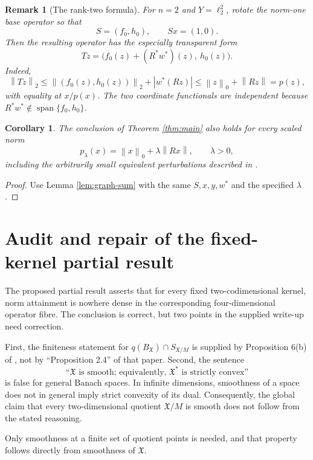 \documentclass[11pt]{article}
\newtheorem{corollary}[theorem]{Corollary}
\newtheorem{remark}[theorem]{Remark}
\theoremstyle{definition}
\newcommand{\X}{\mathfrak X}
\newcommand{\norm}[1]{\left\lVert #1\right\rVert}
\newcommand{\abs}[1]{\left\lvert #1\right\rvert}
\begin{document}
\begin{remark}[The rank-two formula]\label{rem:rank-two-formula}
For \(n=2\) and \(Y=\ell_2^2\), rotate the norm-one base operator so that
\[
                S=(f_0,h_0),\qquad Sx=(1,0).
\]
Then the resulting operator has the especially transparent form
\[
        Tz=\bigl(f_0(z)+(R^*w^*)(z),\ h_0(z)\bigr).
\]
Indeed,
\[
 \norm{Tz}_2
 \leq \norm{(f_0(z),h_0(z))}_2+\abs{w^*(Rz)}
 \leq \norm{z}_0+\norm{Rz}=p(z),
\]
with equality at \(x/p(x)\).  The two coordinate functionals are independent
because \(R^*w^*\notin\operatorname{span}\{f_0,h_0\}\).
\end{remark}

\begin{corollary}\label{cor:scaled}
The conclusion of Theorem \ref{thm:main} also holds for every scaled norm
\[
              p_\lambda(x)=\norm{x}_0+\lambda\norm{Rx},
              \qquad \lambda>0,
\]
including the arbitrarily small equivalent perturbations described in
\cite[Remark 2]{Martin2025}.
\end{corollary}

\begin{proof}
Use Lemma \ref{lem:graph-sum} with the same \(S,x,y,w^*\) and the specified
\(\lambda\).
\end{proof}

\section{Audit and repair of the fixed-kernel partial result}

The proposed partial result asserts that for every fixed two-codimensional
kernel, norm attainment is nowhere dense in the corresponding four-dimensional
operator fibre.  The conclusion is correct, but two points in the supplied
write-up need correction.

First, the finiteness statement for
\(q(B_\X)\cap S_{\X/M}\) is supplied by Proposition 6(b) of
\cite{Martin2025}, not by ``Proposition 2.4'' of that paper.  Second, the
sentence
\[
       \text{``\(\X\) is smooth; equivalently, \(\X^*\) is strictly convex''}
\]
is false for general Banach spaces.  In infinite dimensions, smoothness of a
space does not in general imply strict convexity of its dual.  Consequently,
the global claim that every two-dimensional quotient \(\X/M\) is smooth does
not follow from the stated reasoning.

Only smoothness at a finite set of quotient points is needed, and that property
follows directly from smoothness of \(\X\).
\end{document}
